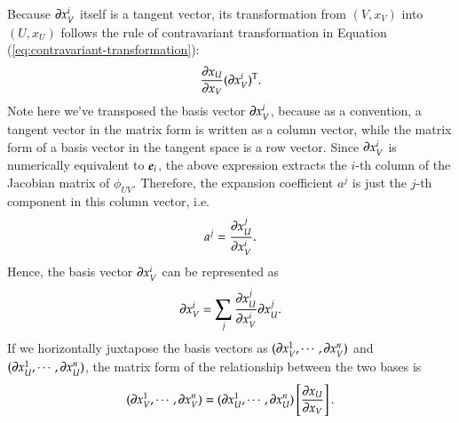 \documentclass[11pt, a4paper]{book}
\begin{document}
Because $\boldsymbol{\partial}x_V^i$ itself is a tangent vector, its transformation from $(V,x_V)$
into $(U,x_U)$ follows the rule of contravariant transformation in Equation
(\ref{eq:contravariant-transformation}):
\begin{equation*}
  \frac{\partial x_U}{\partial x_V} (\boldsymbol{\partial}x_V^i)^{\mathrm{T}}.
\end{equation*}
Note here we've transposed the basis vector $\boldsymbol{\partial}x_V^i$, because as a convention,
a tangent vector in the matrix form is written as a column vector, while the matrix form
of a basis vector in the tangent space is a row vector. Since $\boldsymbol{\partial}x_V^i$ is
numerically equivalent to $\boldsymbol{e}_i$, the above expression extracts the $i$-th column of
the Jacobian matrix of $\phi_{UV}$. Therefore, the expansion coefficient $a^{j}$ is just the
$j$-th component in this column vector, i.e.
\begin{equation}
  a^j = \frac{\partial x_U^j}{\partial x_V^i}.
\end{equation}
Hence, the basis vector $\boldsymbol{\partial}x_V^i$ can be represented as
\begin{equation}
  \label{eq:tangent-vector-basis-relation}
  \boldsymbol{\partial}x_V^i = \sum_j \frac{\partial x_U^j}{\partial x_V^i} \boldsymbol{\partial}x_U^j.
\end{equation}
If we horizontally juxtapose the basis vectors as
$(\boldsymbol{\partial}x_V^1,\cdots,\boldsymbol{\partial}x_V^n)$ and
$(\boldsymbol{\partial}x_U^1,\cdots,\boldsymbol{\partial}x_U^n)$, the matrix form of the
relationship between the two bases is
\begin{equation}
  \label{eq:tangent-space-bases-relation}
  (\boldsymbol{\partial}x_V^1,\cdots,\boldsymbol{\partial}x_V^n) =
  (\boldsymbol{\partial}x_U^1,\cdots,\boldsymbol{\partial}x_U^n) \left[ \frac{\partial x_U}{\partial x_V} \right].
\end{equation}
\end{document}
